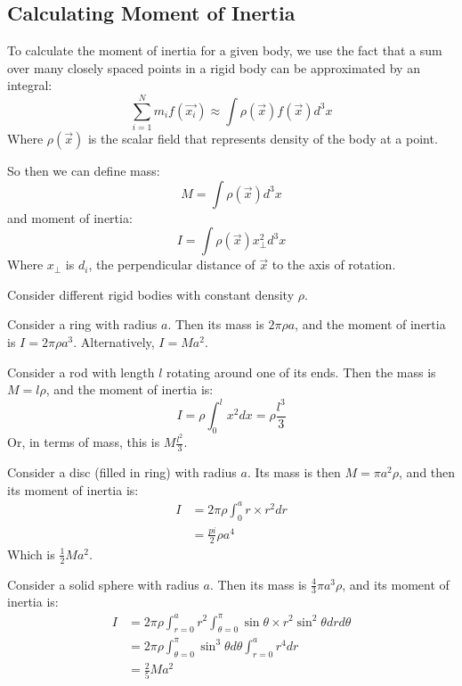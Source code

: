 \documentclass[../Main.tex]{subfiles}
\begin{document}
\subsection{Calculating Moment of Inertia}
To calculate the moment of inertia for a given body, we use the fact that a sum over many closely spaced points in a rigid body can be approximated by an integral:
\begin{equation*}
    \sum_{i=1}^{N} m_i f(\vec{x_i}) \approx \int \rho(\vec{x})f(\vec{x}) d^3x
\end{equation*}
Where $\rho(\vec{x})$ is the scalar field that represents density of the body at a point.\par
So then we can define mass:
\begin{equation}
    M = \int \rho(\vec{x}) d^3x
    \label{eqnIntegralMass}
\end{equation}
and moment of inertia:
\begin{equation}
    I = \int \rho(\vec{x}) x_\perp^2 d^3x
    \label{eqnIntegralMomentInertia}
\end{equation}
Where $x_\perp$ is $d_i$, the perpendicular distance of $\vec{x}$ to the axis of rotation.
\begin{examples}{
        Consider different rigid bodies with constant density $\rho$.
    }
    \item Consider a ring with radius $a$. Then its mass is $2\pi \rho a$, and the moment of inertia is $I = 2 \pi \rho a^3$. Alternatively, $I = Ma^2$.
    \item Consider a rod with length $l$ rotating around one of its ends. Then the mass is $M = l \rho$, and the moment of inertia is:
        \begin{equation*}
            I = \rho \int_0^l x^2 dx = \rho \frac{l^3}{3}
        \end{equation*}
        Or, in terms of mass, this is $M\frac{l^2}{3}$.
    \item Consider a disc (filled in ring) with radius $a$. Its mass is then $M = \pi a^2 \rho$, and then its moment of inertia is:
        \begin{align*}
            I &= 2 \pi \rho \int_0^a r \times r^2 dr \\
            &= \frac{pi}{2} \rho a^4
        \end{align*}
        Which is $\frac{1}{2} M a^2$.
    \item Consider a solid sphere with radius $a$. Then its mass is $\frac{4}{3} \pi a^3 \rho$, and its moment of inertia is:
        \begin{align*}
            I &= 2 \pi \rho \int_{r=0}^a r^2 \int_{\theta = 0}^\pi \sin{\theta} \times r^2 \sin^2{\theta} dr d\theta \\
            &= 2 \pi \rho \int_{\theta = 0}^\pi \sin^3{\theta} d\theta \int_{r=0}^a r^4 dr \\
            &= \frac{2}{5} Ma^2
        \end{align*}
\end{examples}
\end{document}

